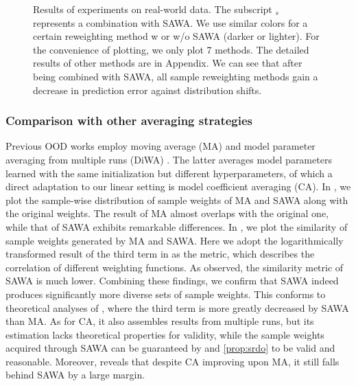 \begin{figure*}[!t]
	\centering
	\caption{Results of experiments on real-world data. The subscript $_s$ represents a combination with SAWA. We use similar colors for a certain reweighting method w or w/o SAWA (darker or lighter). 
    For the convenience of plotting, we only plot 7 methods. The detailed results of other methods are in Appendix. We can see that after being combined with SAWA, all sample reweighting methods gain a decrease in prediction error against distribution shifts. 
 }
 \label{fig:real}
\end{figure*}

\subsubsection{Comparison with other averaging strategies}
Previous OOD works employ moving average (MA) \citep{arpit2022ensemble} and model parameter averaging from multiple runs (DiWA) \citep{rame2022diverse}. The latter averages model parameters learned with the same initialization but different hyperparameters, of which a direct adaptation to our linear setting is model coefficient averaging (CA). 
In , we plot the sample-wise distribution of sample weights of MA and SAWA along with the original weights. 
The result of MA almost overlaps with the original one, while that of SAWA exhibits remarkable differences. 
In , we plot the similarity of sample weights generated by MA and SAWA. Here we adopt the logarithmically transformed result of the third term in  as the metric, which describes the correlation of different weighting functions. 
As observed, the similarity metric of SAWA is much lower. Combining these findings, we confirm that SAWA indeed produces significantly more diverse sets of sample weights. This conforms to theoretical analyses of , where the third term is more greatly decreased by SAWA than MA. 
As for CA, it also assembles results from multiple runs, but its estimation lacks theoretical properties for validity, while the sample weights acquired through SAWA can be guaranteed by  and \ref{prop:srdo} to be valid and reasonable. Moreover,  reveals that despite CA improving upon MA, it still falls behind SAWA by a large margin. 




